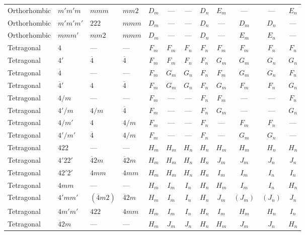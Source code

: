 \documentclass[a4paper,11pt]{article}
\newcommand{\ob}[1]{\overline{#1}}
\begin{document}
\begin{landscape}
\begin{longtable}{l l l l *{4}{c} *{4}{c}}
Orthorhombic & $m'm'm$ & $mmm$ & $mm2$ & $D_m$ & --- & --- & $D_n$ & $E_m$ & --- & --- & $E_n$ \\
Orthorhombic & $m'm'm'$ & $222$ & $mmm$ & $D_m$ & --- & --- & $D_n$ & --- & $D_m$ & $D_n$ & --- \\
Orthorhombic & $mmm'$ & $mm2$ & $mmm$ & $D_m$ & --- & --- & $D_n$ & --- & $E_m$ & $E_n$ & --- \\
\addlinespace
Tetragonal & $4$ & --- & --- & $F_m$ & $F_m$ & $F_n$ & $F_n$ & $F_m$ & $F_m$ & $F_n$ & $F_n$ \\
Tetragonal & $4'$ & $\ob{4}$ & $\ob{4}$ & $F_m$ & $F_m$ & $F_n$ & $F_n$ & $G_m$ & $G_m$ & $G_n$ & $G_n$ \\
Tetragonal & $\ob{4}$ & --- & --- & $F_m$ & $G_m$ & $G_n$ & $F_n$ & $F_m$ & $G_m$ & $G_n$ & $F_n$ \\
Tetragonal & $\ob{4}'$ & $4$ & $\ob{4}$ & $F_m$ & $G_m$ & $G_n$ & $F_n$ & $G_m$ & $F_m$ & $F_n$ & $G_n$ \\
Tetragonal & $4/m$ & --- & --- & $F_m$ & --- & --- & $F_n$ & $F_m$ & --- & --- & $F_n$ \\
Tetragonal & $4'/m$ & $4/m$ & $\ob{4}$ & $F_m$ & --- & --- & $F_n$ & $G_m$ & --- & --- & $G_n$ \\
Tetragonal & $4/m'$ & $4$ & $4/m$ & $F_m$ & --- & --- & $F_n$ & --- & $F_m$ & $F_n$ & --- \\
Tetragonal & $4'/m'$ & $\ob{4}$ & $4/m$ & $F_m$ & --- & --- & $F_n$ & --- & $G_m$ & $G_n$ & --- \\
\newpage
Tetragonal & $422$ & --- & --- & $H_m$ & $H_m$ & $H_n$ & $H_n$ & $H_m$ & $H_m$ & $H_n$ & $H_n$ \\
Tetragonal & $4'22'$ & $\ob{4}2m$ & $\ob{4}2m$ & $H_m$ & $H_m$ & $H_n$ & $H_n$ & $J_m$ & $J_m$ & $J_n$ & $J_n$ \\
Tetragonal & $42'2'$ & $4mm$ & $4mm$ & $H_m$ & $H_m$ & $H_n$ & $H_n$ & $I_m$ & $I_m$ & $I_n$ & $I_n$ \\
Tetragonal & $4mm$ & --- & --- & $H_m$ & $I_m$ & $I_n$ & $H_n$ & $H_m$ & $I_m$ & $I_n$ & $H_n$ \\
Tetragonal & $4'mm'$ & $(\ob{4}m2)$ & $\ob{4}2m$ & $H_m$ & $I_m$ & $I_n$ & $H_n$ & $J_m$ & $(J_m)$ & $(J_n)$ & $J_n$ \\
Tetragonal & $4m'm'$ & $422$ & $4mm$ & $H_m$ & $I_m$ & $I_n$ & $H_n$ & $I_m$ & $H_m$ & $H_n$ & $I_n$ \\
Tetragonal & $\ob{4}2m$ & --- & --- & $H_m$ & $J_m$ & $J_n$ & $H_n$ & $H_m$ & $J_m$ & $J_n$ & $H_n$ \\

\end{longtable}
\end{landscape}
\end{document}
